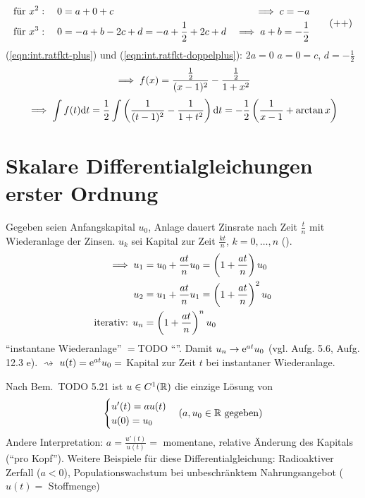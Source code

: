 \documentclass[12pt]{scrreprt}
\begin{document}
\begin{bsp*}
\begin{enumerate}
\begin{equation}
\begin{aligned}
      \text{für } x^2 &:\quad 0=a+0+c                     &\implies c=-a \\
      \text{für } x^3 &:\quad 0=-a+b-2c+d=-a+\frac12+2c+d &\implies a+b=-\frac12
    \end{aligned} \tag{$++$} \end{equation}
    (\ref{eqn:int.ratfkt-plus}) und (\ref{eqn:int.ratfkt-doppelplus}):
    $2a=0$ \folgt $a=0=c$, $d=-\frac12$
    \[\implies f(x)=\frac{\frac12}{(x-1)^2}-\frac{\frac12}{1+x^2}\]
    \[\implies \int{f(t)\mathrm{d}t}=\frac12\int{\left(\frac{1}{(t-1)^2}
        -\frac{1}{1+t^2}\right)\mathrm{d}t}=-\frac12\left(\frac{1}{x-1}+\arctan{x}\right)\]
  \end{enumerate}
\end{bsp*}

\section{Skalare Differentialgleichungen erster Ordnung}
\label{sec:skalare-dgl}

\begin{bsp*}[Zinseszins] Gegeben seien Anfangskapital $u_0$, Anlage
  dauert Zinsrate nach Zeit $\frac{t}{n}$ mit
  Wiederanlage der Zinsen. $u_k$ sei Kapital zur Zeit $\frac{kt}{n}$,
  $k=0,\dotsc,n$ ().
  \begin{align*}\implies  u_1 &= u_0 + \frac{at}{n}u_0 =
    \left(1+\frac{at}{n}\right)u_0\\
    u_2 &= u_1+\frac{at}{n}u_1 = \left(1+\frac{at}{n}\right)^2u_0\\
    \text{iterativ: } u_n &= \left(1+\frac{at}{n}\right)^nu_0
  \end{align*}
  "`instantane Wiederanlage"' $=$TODO "`\ninf"'. Damit $u_n\to
  \mathrm{e}^{at}u_0$ (vgl. Aufg. 5.6, Aufg. 12.3 e). $\rightsquigarrow$
  $u(t)=\mathrm{e}^{at}u_0=$ Kapital zur Zeit $t$ bei instantaner
  Wiederanlage.
\end{bsp*}

\noindent Nach Bem.~TODO 5.21 ist $u\in C^1(\mathbb{R})$ die einzige
Lösung von \[
\begin{cases}
  u'(t)=au(t)\\
  u(0)=u_0
\end{cases}
(a, u_0\in\mathbb{R} \text{ gegeben})
\]
Andere Interpretation: $a = \frac{u'(t)}{u(t)} =$ momentane, relative
Änderung des Kapitals ("`pro Kopf"'). Weitere Beispiele für diese
Differentialgleichung: Radioaktiver Zerfall ($a<0$),
Populationswachstum bei unbeschränktem Nahrungsangebot ($u(t)=$
Stoffmenge)
\end{document}
